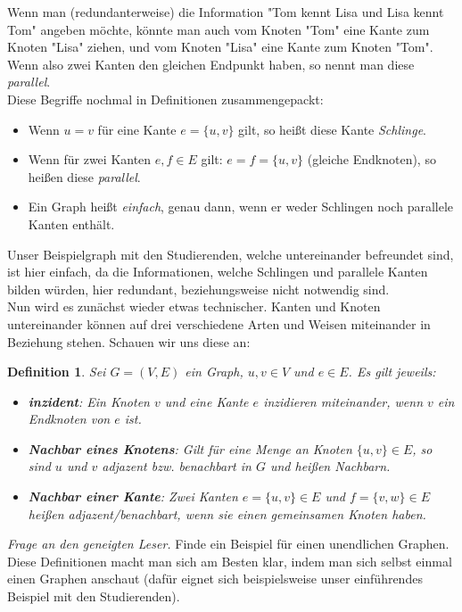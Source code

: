\documentclass{article}
\newtheorem{definition}{Definition}
\begin{document}
\bigskip
Wenn man (redundanterweise) die Information "Tom kennt Lisa und Lisa kennt Tom" angeben möchte, könnte man auch vom Knoten "Tom" eine Kante zum Knoten "Lisa" ziehen, und vom Knoten "Lisa" eine Kante zum Knoten "Tom". Wenn also zwei Kanten den gleichen Endpunkt haben, so nennt man diese \textit{parallel}.\\
\bigskip
Diese Begriffe nochmal in Definitionen zusammengepackt:\\
\begin{itemize}
	\item Wenn \(u = v\) für eine Kante \(e = \{u, v\}\) gilt, so heißt diese Kante \textit{Schlinge}.
	\item Wenn für zwei Kanten \(e, f \in E\) gilt: \(e = f = \{u, v\}\) (gleiche Endknoten), so heißen diese \textit{parallel}. 
	\item Ein Graph heißt \textit{einfach}, genau dann, wenn er weder Schlingen noch parallele Kanten enthält.
\end{itemize}
Unser Beispielgraph mit den Studierenden, welche untereinander befreundet sind, ist hier einfach, da die Informationen, welche Schlingen und parallele Kanten bilden würden, hier redundant, beziehungsweise nicht notwendig sind.\\

\newpage
Nun wird es zunächst wieder etwas technischer. Kanten und Knoten untereinander können auf drei verschiedene Arten und Weisen miteinander in Beziehung stehen. Schauen wir uns diese an:\\
\begin{definition}
    Sei \(G = (V, E)\) ein Graph, \(u, v \in V\) und \(e \in E\).
    Es gilt jeweils:
    \begin{itemize}
        \item \textbf{\textit{inzident}}:
            Ein Knoten \(v\) und eine Kante \(e\) \textit{inzidieren} miteinander, wenn \(v\) ein \textit{Endknoten} von \(e\) ist.
        \item \textbf{\textit{Nachbar eines Knotens}}:
            Gilt für eine Menge an Knoten \(\{u, v\} \in E\), so sind \(u\) und \(v\) \textit{adjazent} bzw. \textit{benachbart} in \(G\) und heißen \textit{Nachbarn}.
        \item \textbf{\textit{Nachbar einer Kante}}:
            Zwei Kanten \(e = \{u, v\} \in E\) und \(f = \{v, w\} \in E\) heißen \textit{adjazent/benachbart}, wenn sie einen gemeinsamen Knoten haben.
    \end{itemize}
\end{definition}
\bigskip
\emph{Frage an den geneigten Leser.} Finde ein Beispiel für einen unendlichen Graphen.
\bigskip
Diese Definitionen macht man sich am Besten klar, indem man sich selbst einmal einen Graphen anschaut (dafür eignet sich beispielsweise unser einführendes Beispiel mit den Studierenden).\\
\end{document}
